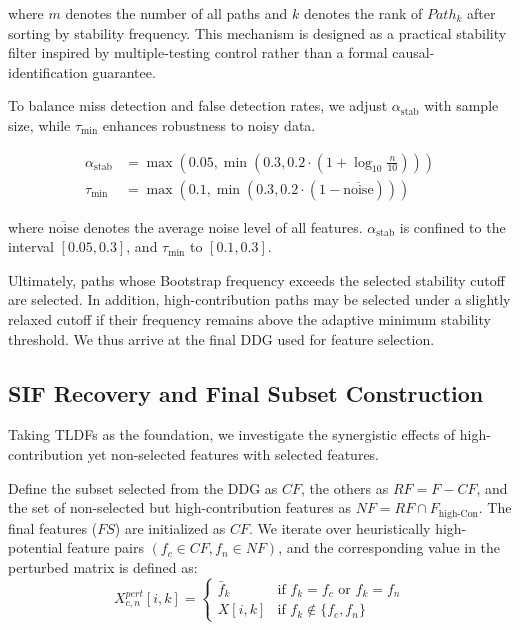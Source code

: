 \documentclass[journal]{IEEEtran}
\begin{document}
where $m$ denotes the number of all paths and $k$ denotes the rank of $Path_k$ after sorting by stability frequency. This mechanism is designed as a practical stability filter inspired by multiple-testing control rather than a formal causal-identification guarantee.

To balance miss detection and false detection rates, we adjust $\alpha_{\text{stab}}$ with sample size, while $\tau_{\min}$ enhances robustness to noisy data.

\begin{align}
\alpha_{\text{stab}} &= \max\left(0.05, \min\left(0.3, 0.2 \cdot \left(1 + \log_{10}\frac{n}{10}\right)\right)\right) \label{eq:alpha_stab} \\
\tau_{\min} &= \max\left(0.1, \min\left(0.3, 0.2 \cdot (1-\overline{\text{noise}})\right)\right) \label{eq:tau_min}
\end{align}

where $\overline{\text{noise}}$ denotes the average noise level of all features. $\alpha_{\text{stab}}$ is confined to the interval $[0.05, 0.3]$, and $\tau_{\min}$ to $[0.1, 0.3]$.

Ultimately, paths whose Bootstrap frequency exceeds the selected stability cutoff are selected. In addition, high-contribution paths may be selected under a slightly relaxed cutoff if their frequency remains above the adaptive minimum stability threshold. We thus arrive at the final DDG used for feature selection.

\subsection{SIF Recovery and Final Subset Construction}
Taking TLDFs as the foundation, we investigate the synergistic effects of high-contribution yet non-selected features with selected features.

Define the subset selected from the DDG as $CF$, the others as $RF=F-CF$, and the set of non-selected but high-contribution features as $NF = RF\cap F_{\text{high-Con}}$. The final features ($FS$) are initialized as $CF$. We iterate over heuristically high-potential feature pairs $(f_c \in CF,f_n \in NF)$, and the corresponding value in the perturbed matrix is defined as:
\begin{equation}
   X^{pert}_{c,n}[i,k] = 
\begin{cases} 
\bar{f}_k & \text{if } f_k = f_c \text{ or } f_k = f_n \\
X[i,k] & \text{if } f_k \notin \{f_c,f_n\}
\end{cases} 
\end{equation}
\end{document}
